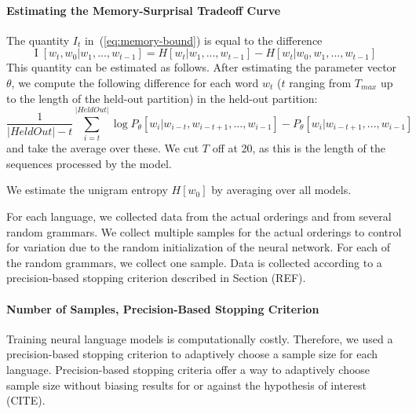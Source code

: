 \paragraph{Estimating the Memory-Surprisal Tradeoff Curve}
The quantity $I_t$ in~(\ref{eq:memory-bound}) is equal to the difference 
\begin{equation}
\operatorname{I}[w_t, w_0 | w_1, ..., w_{t-1}] = H[w_t|w_1, ..., w_{t-1}] - H[w_t|w_0, w_1, ..., w_{t-1}]
\end{equation}
This quantity can be estimated as follows.
After estimating the parameter vector $\theta$, we compute the following difference for each word $w_t$ ($t$ ranging from $T_{max}$ up to the length of the held-out partition) in the held-out partition:
\begin{equation}
	\frac{1}{|HeldOut|-t} \sum_{i=t}^{|HeldOut|} \log P_\theta[w_i | w_{i-t}, w_{i-t+1}, ..., w_{i-1}] - P_\theta[w_i | w_{i-t+1}, ..., w_{i-1}]
\end{equation}
and take the average over these.
We cut $T$ off at 20, as this is the length of the sequences processed by the model.


We estimate the unigram entropy $H[w_0]$ by averaging over all models.

For each language, we collected data from the actual orderings and from several random grammars.
We collect multiple samples for the actual orderings to control for variation due to the random initialization of the neural network.
For each of the random grammars, we collect one sample.
Data is collected according to a precision-based stopping criterion described in Section (REF).


\paragraph{Number of Samples, Precision-Based Stopping Criterion}
Training neural language models is computationally costly.
Therefore, we used a precision-based stopping criterion to adaptively choose a sample size for each language.
Precision-based stopping criteria offer a way to adaptively choose sample size without biasing results for or against the hypothesis of interest (CITE).

